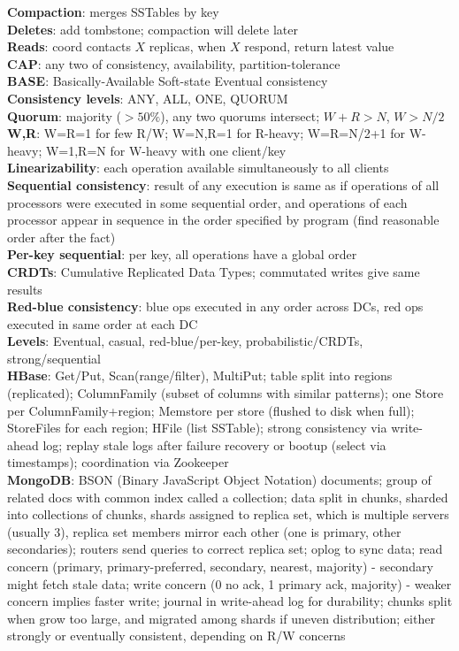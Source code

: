 \documentclass{article}
\begin{document}
\begin{multicols*}{3}
\textbf{Compaction}: merges SSTables by key \\
\textbf{Deletes}: add tombstone; compaction will delete later \\
\textbf{Reads}: coord contacts $X$ replicas, when $X$ respond, return latest value \\
\textbf{CAP}: any two of consistency, availability, partition-tolerance \\
\textbf{BASE}: Basically-Available Soft-state Eventual consistency \\
\textbf{Consistency levels}: ANY, ALL, ONE, QUORUM \\
\textbf{Quorum}: majority ($> 50\%$), any two quorums intersect; $W+R>N$, $W>N/2$ \\
\textbf{W,R}: W=R=1 for few R/W; W=N,R=1 for R-heavy; W=R=N/2+1 for W-heavy; W=1,R=N for W-heavy with one client/key \\
\textbf{Linearizability}: each operation available simultaneously to all clients \\
\textbf{Sequential consistency}: result of any execution is same as if operations of all processors were executed in some sequential order, and operations of each processor appear in sequence in the order specified by program (find reasonable order after the fact) \\
\textbf{Per-key sequential}: per key, all operations have a global order \\
\textbf{CRDTs}: Cumulative Replicated Data Types; commutated writes give same results \\
\textbf{Red-blue consistency}: blue ops executed in any order across DCs, red ops executed in same order at each DC \\
\textbf{Levels}: Eventual, casual, red-blue/per-key, probabilistic/CRDTs, strong/sequential \\
\textbf{HBase}: Get/Put, Scan(range/filter), MultiPut; table split into regions (replicated); ColumnFamily (subset of columns with similar patterns); one Store per ColumnFamily+region; Memstore per store (flushed to disk when full); StoreFiles for each region; HFile (list SSTable); strong consistency via write-ahead log; replay stale logs after failure recovery or bootup (select via timestamps); coordination via Zookeeper \\
\textbf{MongoDB}: BSON (Binary JavaScript Object Notation) documents; group of related docs with common index called a collection; data split in chunks, sharded into collections of chunks, shards assigned to replica set, which is multiple servers (usually 3), replica set members mirror each other (one is primary, other secondaries); routers send queries to correct replica set; oplog to sync data; read concern (primary, primary-preferred, secondary, nearest, majority) - secondary might fetch stale data; write concern (0 no ack, 1 primary ack, majority) - weaker concern implies faster write; journal in write-ahead log for durability; chunks split when grow too large, and migrated among shards if uneven distribution; either strongly or eventually consistent, depending on R/W concerns


\end{multicols*}
\end{document}
